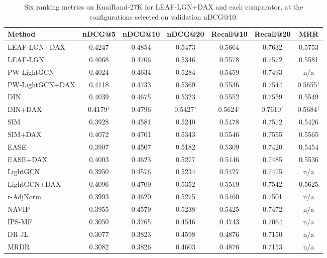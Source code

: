 \begin{table}[tbp]
\centering
\footnotesize
\caption{Six ranking metrics on KuaiRand-27K for LEAF-LGN+DAX and each comparator, at the configurations selected on validation nDCG@10.}
\label{tab:metrics}
\begin{adjustbox}{max width=\linewidth}
\begin{tabular}{lcccccc}
\toprule
Method & nDCG@5 & nDCG@10 & nDCG@20 & Recall@10 & Recall@20 & MRR \\
\midrule
LEAF-LGN+DAX & 0.4247 & 0.4854 & 0.5473 & 0.5664 & 0.7632 & 0.5753 \\
LEAF-LGN & 0.4068 & 0.4706 & 0.5346 & 0.5578 & 0.7572 & 0.5581 \\
\midrule
PW-LightGCN & 0.4024 & 0.4634 & 0.5284 & 0.5459 & 0.7493 & n/a \\
PW-LightGCN+DAX & 0.4118 & 0.4733 & 0.5369 & 0.5536 & 0.7544 & 0.5655$^{\dagger}$ \\
\midrule
DIN & 0.4039 & 0.4675 & 0.5323 & 0.5552 & 0.7559 & 0.5549 \\
DIN+DAX & 0.4179$^{\dagger}$ & 0.4796 & 0.5427$^{\dagger}$ & 0.5624$^{\dagger}$ & 0.7610$^{\dagger}$ & 0.5684$^{\dagger}$ \\
SIM & 0.3928 & 0.4581 & 0.5240 & 0.5478 & 0.7512 & 0.5426 \\
SIM+DAX & 0.4072 & 0.4701 & 0.5343 & 0.5546 & 0.7555 & 0.5565 \\
EASE & 0.3907 & 0.4507 & 0.5182 & 0.5309 & 0.7420 & 0.5454 \\
EASE+DAX & 0.4003 & 0.4623 & 0.5277 & 0.5446 & 0.7485 & 0.5536 \\
\midrule
LightGCN & 0.3950 & 0.4576 & 0.5234 & 0.5427 & 0.7475 & n/a \\
LightGCN+DAX & 0.4096 & 0.4709 & 0.5352 & 0.5519 & 0.7542 & 0.5625 \\
r-AdjNorm & 0.3993 & 0.4620 & 0.5275 & 0.5460 & 0.7501 & n/a \\
\midrule
NAVIP & 0.3955 & 0.4579 & 0.5238 & 0.5425 & 0.7472 & n/a \\
IPS-MF & 0.3050 & 0.3765 & 0.4546 & 0.4743 & 0.7064 & n/a \\
DR-JL & 0.3077 & 0.3823 & 0.4598 & 0.4876 & 0.7150 & n/a \\
MRDR & 0.3082 & 0.3826 & 0.4603 & 0.4876 & 0.7153 & n/a \\
\bottomrule
\end{tabular}
\end{adjustbox}
\par\smallskip

\end{table}
